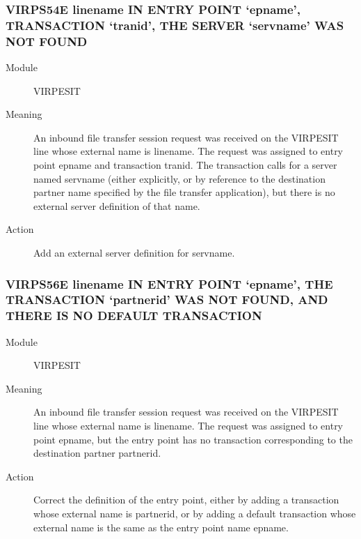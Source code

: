 \documentclass[letterpaper,10pt,english]{sphinxmanual}
\begin{document}
\subsubsection{VIRPS54E linename IN ENTRY POINT ‘epname’, TRANSACTION ‘tranid’, THE SERVER ‘servname’ WAS NOT FOUND}
\label{\detokenize{messages:virps54e-linename-in-entry-point-epname-transaction-tranid-the-server-servname-was-not-found}}\begin{description}
\item[{Module}] \leavevmode
VIRPESIT

\item[{Meaning}] \leavevmode
An inbound file transfer session request was received on the VIRPESIT line whose external name is linename.       The request was assigned to entry point epname and transaction tranid. The transaction calls for a server named servname (either explicitly, or by reference to the destination partner name specified by the file transfer application), but there is no external server definition of that name.

\item[{Action}] \leavevmode
Add an external server definition for servname.

\end{description}


\subsubsection{VIRPS56E linename IN ENTRY POINT ‘epname’, THE TRANSACTION ‘partnerid’ WAS NOT FOUND, AND THERE IS NO DEFAULT TRANSACTION}
\label{\detokenize{messages:virps56e-linename-in-entry-point-epname-the-transaction-partnerid-was-not-found-and-there-is-no-default-transaction}}\begin{description}
\item[{Module}] \leavevmode
VIRPESIT

\item[{Meaning}] \leavevmode
An inbound file transfer session request was received on the VIRPESIT line whose external name is linename. The request was assigned to entry point epname, but the entry point has no transaction corresponding to the destination partner partnerid.

\item[{Action}] \leavevmode
Correct the definition of the entry point, either by adding a transaction whose external name is partnerid, or by adding a default transaction whose external name is the same as the entry point name epname.

\end{description}
\end{document}
